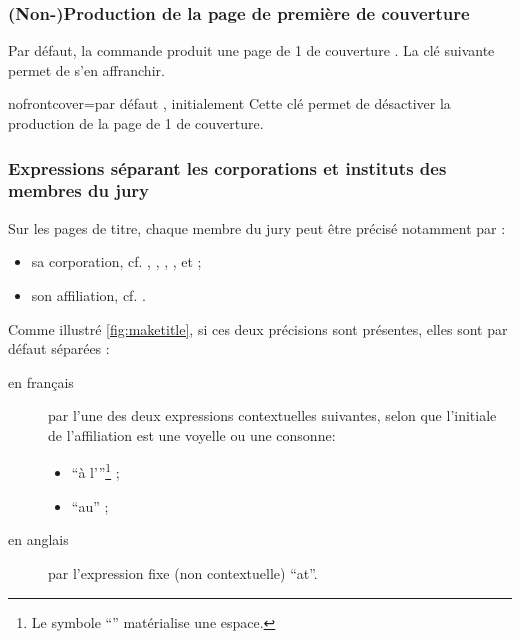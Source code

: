 \subsubsection{(Non-)Production de la page de première de
  couverture}\label{sec:non-production-de}

Par défaut, la commande  produit une page de 1\iere{} de
couverture . La clé
 suivante permet de s'en affranchir.

\begin{docKey}{nofrontcover}{=\textbar{}}{par défaut
    , initialement }
  Cette clé permet de désactiver la production de la page de 1\iere{} de
  couverture.
\end{docKey}

\subsubsection{Expressions séparant les corporations et instituts des membres
  du jury}
\label{sec:expr-separ-les}

Sur les pages de titre, chaque membre du jury peut être précisé notamment par :
\begin{itemize}
\item sa corporation, cf. , , ,
  ,  et
   ;
\item son affiliation, cf. .
\end{itemize}
Comme illustré \vref{fig:maketitle}, si ces deux précisions sont présentes,
elles sont par défaut séparées :
\begin{description}
\item[en français] par l'une des deux expressions contextuelles suivantes,
  selon que l'initiale de l'affiliation est une voyelle ou une consonne:
  \begin{itemize}
  \item \enquote{\textvisiblespace{}à l'}\footnote{Le symbole
      \enquote{\textvisiblespace{}} matérialise une espace.} ;
  \item \enquote{\textvisiblespace{}au\textvisiblespace{}} ;
  \end{itemize}
\item[en anglais] par l'expression fixe (non contextuelle)
  \enquote{\textvisiblespace{}at\textvisiblespace{}}.
\end{description}

